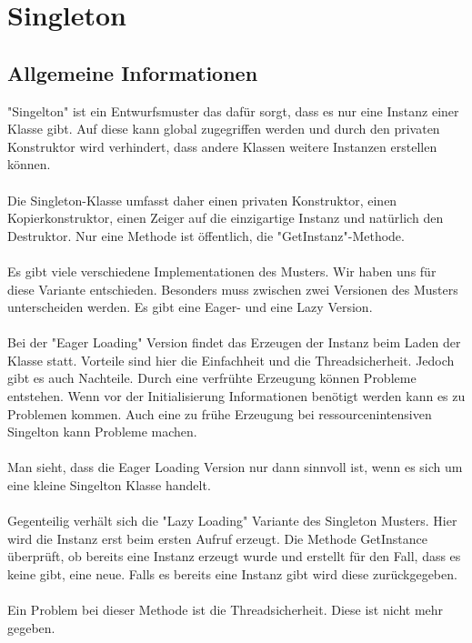 \chapter{Singleton}

\section{Allgemeine Informationen}

"Singelton" ist ein Entwurfsmuster das dafür sorgt, dass es nur eine Instanz einer Klasse gibt. Auf diese kann global zugegriffen werden und durch den privaten Konstruktor wird verhindert, dass andere Klassen weitere Instanzen erstellen können.
\\
\\
Die Singleton-Klasse umfasst daher einen privaten Konstruktor, einen Kopierkonstruktor, einen Zeiger auf die einzigartige Instanz und natürlich den Destruktor. Nur eine Methode ist öffentlich, die "GetInstanz"-Methode.
\\
\\
Es gibt viele verschiedene Implementationen des Musters. Wir haben uns für diese Variante entschieden. Besonders muss zwischen zwei Versionen des Musters unterscheiden werden. Es gibt eine Eager- und eine Lazy Version.
\\
\\
Bei der "Eager Loading" Version findet das Erzeugen der Instanz beim Laden der Klasse statt. Vorteile sind hier die Einfachheit und die Threadsicherheit. Jedoch gibt es auch Nachteile. Durch eine verfrühte Erzeugung können Probleme entstehen. Wenn vor der Initialisierung Informationen benötigt werden kann es zu Problemen kommen. Auch eine zu frühe Erzeugung bei ressourcenintensiven Singelton kann Probleme machen.
\\
\\
Man sieht, dass die Eager Loading Version nur dann sinnvoll ist, wenn es sich um eine kleine Singelton Klasse handelt.
\\
\\
Gegenteilig verhält sich die "Lazy Loading" Variante des Singleton Musters. Hier wird die Instanz erst beim ersten Aufruf erzeugt. Die Methode GetInstance überprüft, ob bereits eine Instanz erzeugt wurde und erstellt für den Fall, dass es keine gibt, eine neue. Falls es bereits eine Instanz gibt wird diese zurückgegeben.
\\
\\
Ein Problem bei dieser Methode ist die Threadsicherheit. Diese ist nicht mehr gegeben.

